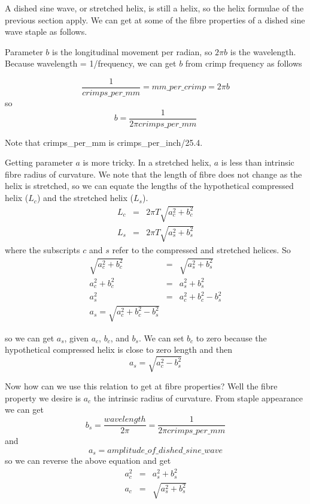 \documentclass[titlepage,10pt]{article}  %
\begin{document}
A dished sine wave, or stretched helix, is still a helix, so the helix formulae of the previous section apply. We can get at some of the fibre properties of a dished sine wave staple as follows.

Parameter $b$ is the longitudinal movement per radian, so $2 \pi b$ is the wavelength. Because wavelength = 1/frequency, we can get $b$ from crimp frequency as follows

\begin{displaymath}
\frac{1}{crimps\_per\_mm} = mm\_per\_crimp = 2 \pi b
\end{displaymath}
so
\begin{displaymath}
b = \frac{1}{2 \pi crimps\_per\_mm}
\end{displaymath}

Note that crimps\_per\_mm is crimps\_per\_inch/25.4.

Getting parameter $a$ is more tricky. In a stretched helix, $a$ is less than intrinsic fibre radius of curvature. We note that the length of fibre does not change as the helix is stretched, so we can equate the lengths of the hypothetical compressed helix ($L_{c}$) and the stretched helix ($L_{s}$).
\begin{eqnarray*}
 L_{c} & = & 2 \pi T \sqrt{a_{c}^{2} + b_{c}^{2}} \\
 L_{s} & = & 2 \pi T \sqrt{a_{s}^{2} + b_{s}^{2}}
\end{eqnarray*}
where the subscripts $c$ and $s$ refer to the compressed and stretched helices. So
\begin{eqnarray*}
\sqrt{a_{c}^{2} + b_{c}^{2}} & = & \sqrt{a_{s}^{2} + b_{s}^{2}} \\
a_{c}^{2} + b_{c}^{2} & = & a_{s}^{2} + b_{s}^{2} \\
a_{s}^{2} & = & a_{c}^{2} + b_{c}^{2} - b_{s}^{2} \\
a_{s} = \sqrt{a_{c}^{2} + b_{c}^{2} - b_{s}^{2}}
\end{eqnarray*}

so we can get $a_{s}$, given $a_{c}$, $b_{c}$, and $b_{s}$.  We can set $b_{c}$ to zero because the hypothetical compressed helix is close to zero length
and then
\begin{displaymath}
a_{s} = \sqrt{a_{c}^{2}- b_{s}^{2}}
\end{displaymath}

Now how can we use this relation to get at fibre properties? Well the fibre property we desire is $a_{c}$ the intrinsic radius of curvature. From staple appearance we can get 
\begin{displaymath}
b_{s} = \frac{wavelength}{2\pi} = \frac{1}{2 \pi crimps\_per\_mm}
\end{displaymath}
and 
\begin{displaymath}
a_{s} = amplitude\_of\_dished\_sine\_wave
\end{displaymath}
so we can reverse the above equation and get
\begin{eqnarray*}
a_{c}^{2} & = & a_{s}^{2} + b_{s}^{2} \\
a_{c} & = & \sqrt{a_{s}^{2} + b_{s}^{2}}
\end{eqnarray*}
\end{document}
